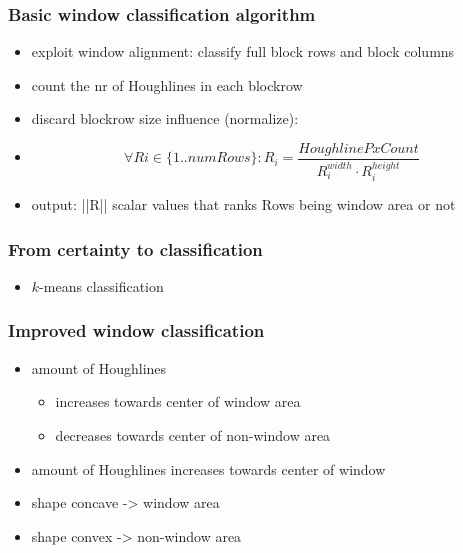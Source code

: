\documentclass{beamer}
\begin{document}
\frame
{
	\frametitle{Basic window classification algorithm}
	\begin{itemize}
	\item <+-| alert@+> exploit window alignment: classify full block rows and block columns
	\item <+-| alert@+> count the nr of Houghlines in each blockrow
	\item <+-| alert@+> discard blockrow size influence (normalize):
	\item <+-| alert@+> \[\forall Ri\in \{1..numRows\} : R_i = \frac{HoughlinePxCount}{R_i^{width} \cdot R_i^{height}}\]
	\item <+-| alert@+> output: ||R|| scalar values that ranks Rows being window area or not
	\end{itemize}
	

}

\frame
{
}

\frame
{
}

\frame
{
}



\frame
{
	\frametitle{From certainty to classification}
	\begin{itemize}
	\item <+-| alert@+> $k$-means classification

	\end{itemize}
}

\frame
{
}

\frame
{
	\frametitle{Improved window classification}
	\begin{itemize}
	\item <+-| alert@+> amount of Houghlines 
		\begin{itemize}
		\item <+-| alert@+> increases towards center of window area
		\item <+-| alert@+> decreases towards center of non-window area
		\end{itemize}
	\item <+-| alert@+> amount of Houghlines increases towards center of window
	\item <+-| alert@+> shape concave -> window area
	\item <+-| alert@+> shape convex -> non-window area
	\end{itemize}
}
\frame
{
}
\end{document}
